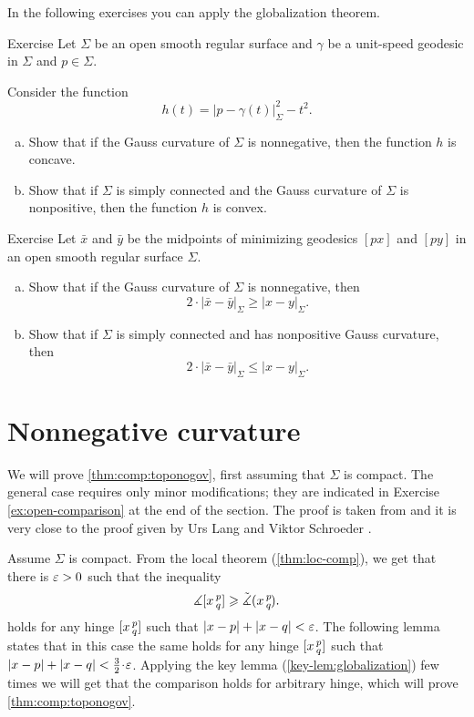 In the following exercises you can apply the globalization theorem.

\begin{thm}{Exercise}\label{ex:geod-convexity}
Let $\Sigma$ be an open smooth regular surface
and $\gamma$ be a unit-speed geodesic in $\Sigma$ and $p\in\Sigma$.

Consider the function
\[h(t)=|p-\gamma(t)|_\Sigma^2-t^2.\]

\begin{enumerate}[(a)]
\item Show that if the Gauss curvature of $\Sigma$ is nonnegative, then the function $h$ is concave.
\item Show that if $\Sigma$ is simply connected and the Gauss curvature of $\Sigma$ is nonpositive, then the function $h$ is convex.
\end{enumerate}
\end{thm}


\begin{thm}{Exercise}\label{ex:midpoints}
Let $\bar x$ and $\bar y$ be the midpoints of minimizing geodesics $[px]$ and $[py]$ in an open smooth regular surface $\Sigma$.
\begin{enumerate}[(a)]
 \item Show that if the Gauss curvature of $\Sigma$ is nonnegative, then 
 \[2\cdot |\bar x-\bar y|_\Sigma\ge |x-y|_\Sigma.\]
 \item Show that if $\Sigma$ is simply connected and has nonpositive Gauss curvature, then 
 \[2\cdot |\bar x-\bar y|_\Sigma\le |x-y|_\Sigma.\]
\end{enumerate}

\end{thm}


\section{Nonnegative curvature}\label{sec:nonneg-comp}

We will prove \ref{thm:comp:toponogov}, first assuming that $\Sigma$ is compact.
The general case requires only minor modifications; they are indicated in Exercise \ref{ex:open-comparison} at the end of the section.
The proof is taken from \cite{alexander-kapovitch-petrunin2027} and it is very close to the proof given by Urs Lang and Viktor Schroeder \cite{lang-schroeder}.

\label{proof(thm:comp:toponogov)}
Assume $\Sigma$ is compact. 
From the local theorem (\ref{thm:loc-comp}), we get that there is $\varepsilon>0$ such that the inequality 
\[\measuredangle[x\,{}^{p}_{q}]\geqslant\tilde\measuredangle(x\,{}^{p}_{q}\hspace{-0.2ex}).\]
holds for any hinge $[x\,{}^{p}_{q}]$ such that $|x-p|+|x-q|<\varepsilon$.
The following lemma states that in this case the same holds for any hinge $[x\,{}^{p}_{q}]$ such that $|x-p|+|x-q|<\tfrac32\cdot\eps$.
Applying the key lemma (\ref{key-lem:globalization}) few times we will get that the comparison holds for arbitrary hinge, which will prove \mbox{\ref{thm:comp:toponogov}}.
\qeds

